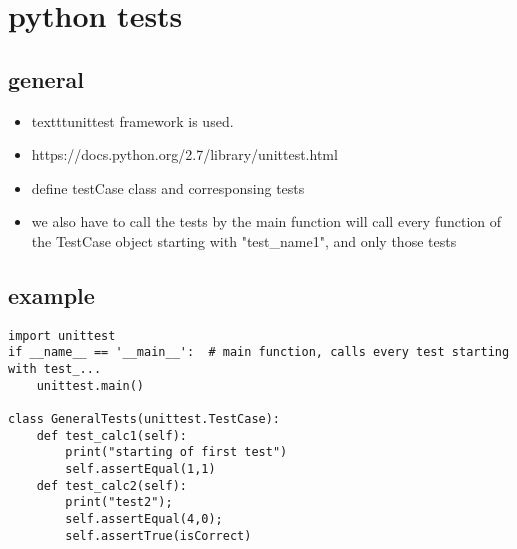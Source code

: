 \documentclass[openright,titlepage,numbers=noenddot,headinclude,%
                footinclude=true,abstractoff, %
                BCOR=5mm,paper=a4,fontsize=11pt,%
                ]{scrreprt}
\begin{document}
\chapter{python tests}
\section{general}
\begin{itemize}
\item texttt{unittest} framework is used.
\item https://docs.python.org/2.7/library/unittest.html
\item define testCase class and corresponsing tests
\item we also have to call the tests by the main function will call every function of the TestCase object starting with "test\_name1", and only those tests
\end{itemize}
\section{example}
\begin{lstlisting}
import unittest
if __name__ == '__main__':  # main function, calls every test starting with test_...
    unittest.main()
    
class GeneralTests(unittest.TestCase):
	def test_calc1(self):
		print("starting of first test")
		self.assertEqual(1,1)
	def test_calc2(self):
		print("test2");
		self.assertEqual(4,0);
		self.assertTrue(isCorrect)

\end{lstlisting}
\end{document}
